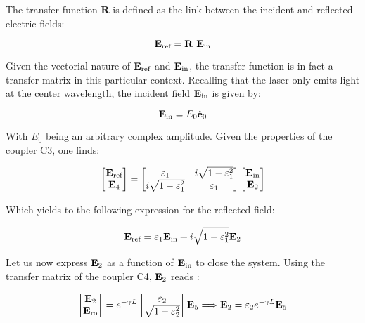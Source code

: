 The transfer function $\mathbf{R}$ is defined as the link between the incident and reflected electric fields:

\begin{equation}
	\mathbf{E}_{\text{ref}} = \mathbf{R} ~\mathbf{E}_{\text{in}}
\end{equation}

Given the vectorial nature of $\mathbf{E}_{\text{ref}}$ and $\mathbf{E}_{\text{in}}$, the transfer function is in fact a transfer matrix in this particular context. Recalling that the laser only emits light at the center wavelength, the incident field $\mathbf{E}_{\text{in}}$ is given by:

\begin{equation}
	\mathbf{E}_{\text{in}} = E_0 \hat{\mathbf{e}}_0
\end{equation}

With $E_0$ being an arbitrary complex amplitude. Given the properties of the coupler C3, one finds:

\begin{equation}
	\begin{bmatrix}
		\mathbf{E}_{\text{ref}}\\
		\mathbf{E}_{\text{4}}
	\end{bmatrix} = \begin{bmatrix}
		\varepsilon_1 & i\sqrt{1-\varepsilon_1^2} \\
		i\sqrt{1-\varepsilon_1^2} & \varepsilon_1
	\end{bmatrix}
	\begin{bmatrix}
		\mathbf{E}_{\text{in}}\\
		\mathbf{E}_{\text{2}}
	\end{bmatrix} 
\end{equation}

Which yields to the following expression for the reflected field:

\begin{equation}
	\mathbf{E}_{\text{ref}} = \varepsilon_1 \mathbf{E}_{\text{in}} + i \sqrt{1-\varepsilon_1^2} \mathbf{E}_{\text{2}}
	\label{eq-ref}
\end{equation}

Let us now express $\mathbf{E}_{\text{2}}$ as a function of $\mathbf{E}_{\text{in}}$ to close the system. Using the transfer matrix of the coupler C4, $\mathbf{E}_{\text{2}}$ reads :

\begin{equation}
	\begin{bmatrix}
		\mathbf{E}_{\text{2}}\\
		\mathbf{E}_{\text{ro}}
	\end{bmatrix} = e^{-\gamma L} \begin{bmatrix}
		\varepsilon_2\\
		\sqrt{1-\varepsilon_2^2}
	\end{bmatrix} \mathbf{E}_{\text{5}} \Longrightarrow \mathbf{E}_{\text{2}} = \varepsilon_2 e^{-\gamma L} \mathbf{E}_{\text{5}}
\end{equation}

